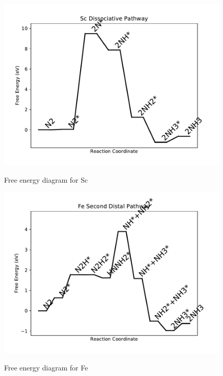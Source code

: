 \documentclass{article}
\begin{document}
\begin{figure}
\includegraphics[width=1\linewidth]{data/plots/Sc_dissociative.pdf}
\label{fig:Sc_dissociative}
\caption{Free energy diagram for Sc}
\end{figure}

\clearpage
\begin{figure}
\includegraphics[width=1\linewidth]{data/plots/Fe_distal_2.pdf}
\label{fig:Fe_distal_2}
\caption{Free energy diagram for Fe}
\end{figure}
\end{document}
